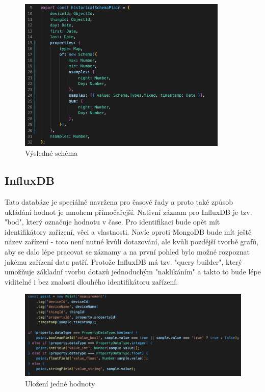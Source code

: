 \documentclass{article}
\begin{document}
\begin{figure}[htbp]
\includegraphics[width=10cm]{images/full_schema.png}
\centering 
\caption{Výsledné schéma}
\end{figure}



\subsection{InfluxDB}
Tato databáze je speciálně navržena pro časové řady a proto také způsob ukládání hodnot je mnohem přímočařejší. Nativní záznam pro InfluxDB je tzv. "bod", který označuje hodnotu v čase. Pro identifikaci bude opět mít identifikátory zařízení, věci a vlastnosti. Navíc oproti MongoDB bude mít ještě název zařízení - toto není nutné kvůli dotazování, ale kvůli pozdější tvorbě grafů, aby se dalo lépe pracovat se záznamy a na první pohled bylo možné rozpoznat jakému zařízení data patří. Protože InfluxDB má tzv. "query builder", který umožňuje základní tvorbu dotazů jednoduchým "naklikáním" a takto to bude lépe viditelné i bez znalosti dlouhého identifikátoru zařízení.

\begin{figure}[htbp]
\includegraphics[width=15cm]{images/influx_point.png}
\centering 
\caption{Uložení jedné hodnoty} 
\end{figure}
\end{document}
